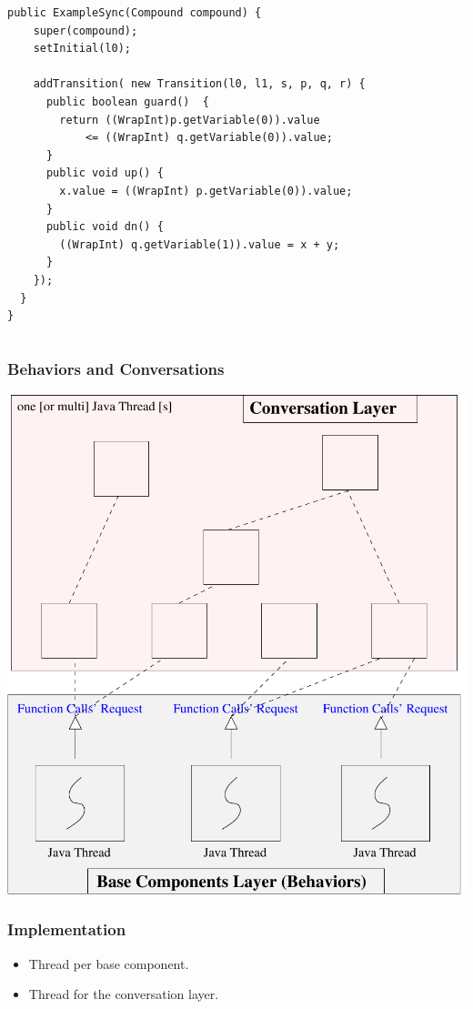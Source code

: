 \documentclass[compress,xcolor=dvipsnames,10pt]{beamer}
\begin{document}
\begin{frame}[fragile]
\begin{columns}
\begin{column}{0.55\linewidth}
\begin{lstlisting}[style=customjava, basicstyle=\ttfamily\tiny]
  public ExampleSync(Compound compound) {
    super(compound);
    setInitial(l0);
    
    addTransition( new Transition(l0, l1, s, p, q, r) {
      public boolean guard()  { 
        return ((WrapInt)p.getVariable(0)).value 
            <= ((WrapInt) q.getVariable(0)).value;
      }
      public void up() { 
        x.value = ((WrapInt) p.getVariable(0)).value; 
      }
      public void dn() { 
        ((WrapInt) q.getVariable(1)).value = x + y; 
      }
    });
  }
}
\end{lstlisting}
  \end{column}
 \end{columns}
\end{frame}

\begin{frame}
 \frametitle{Behaviors and Conversations}
 \begin{center}
  \includegraphics[scale=0.45]{figs/javabip.pdf}
 \end{center}

\end{frame}



\begin{frame}[fragile]
 \frametitle{Implementation}
 \begin{itemize}
  \item Thread per base component.
  \item Thread for the conversation layer.
 \end{itemize}

\end{frame}
\end{document}
